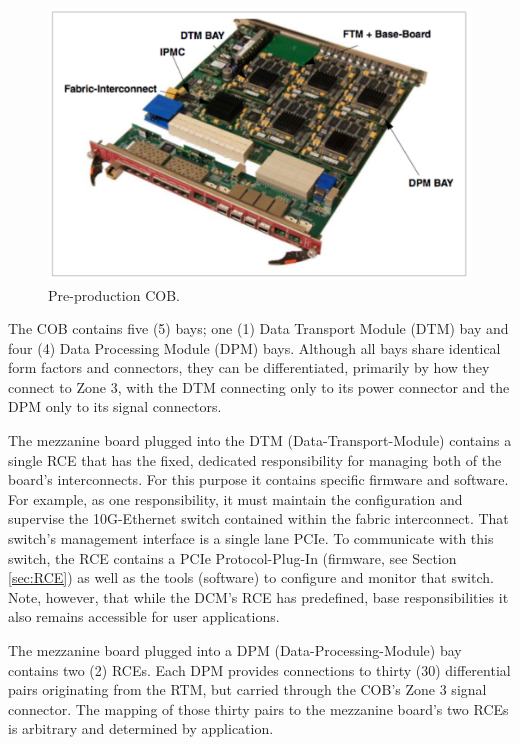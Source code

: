 \begin{figure}[tbh]
\includegraphics[scale=0.8]{cob-photo.pdf}
\caption{Pre-production COB.  }
\label{fig:cob}
\end{figure} 


The COB contains five (5) bays; one (1) Data Transport Module (DTM) bay 
and four (4) Data Processing Module (DPM) bays. 
Although all bays share identical form factors and connectors, 
they can be differentiated, primarily by how they connect to Zone 3,
with the DTM connecting only to its power connector and the DPM 
only to its signal connectors.

The mezzanine board plugged into the DTM (Data-Transport-Module) 
contains a single RCE that has the fixed, dedicated responsibility for 
managing both of the board's interconnects. 
For this purpose it contains specific firmware and software. 
For example, as one responsibility, it must maintain the 
configuration and supervise the 10G-Ethernet switch contained 
within the fabric interconnect. 
That switch's management interface is a single lane PCIe. 
To communicate with this switch, the RCE contains a 
PCIe Protocol-Plug-In (firmware, see Section \ref{sec:RCE}) 
as well as the tools (software) to configure and monitor that switch. 
Note, however, that while the DCM's RCE has predefined, base 
responsibilities it also remains accessible for user applications.

The mezzanine board plugged into a DPM (Data-Processing-Module)
bay contains two (2) RCEs. 
Each DPM provides connections to thirty 
(30) differential pairs originating from the RTM, 
but carried through the COB's Zone 3 signal connector. 
The mapping of those thirty pairs to the mezzanine board's 
two RCEs is arbitrary and determined by application. 

